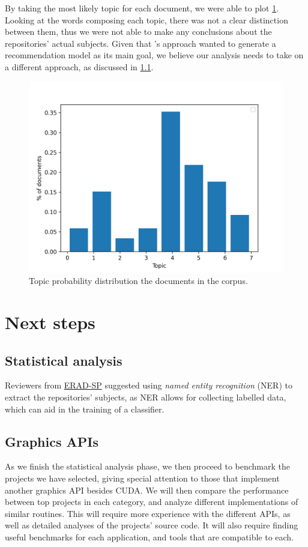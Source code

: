 \documentclass[conference, onecolumn]{IEEEtran}
\begin{document}
By taking the most likely topic for each document, we were able to plot
\cref{fig:topic-probabilities}.
Looking at the words composing each topic, there was not a clear distinction
between them, thus we were not able to make any conclusions about the
repositories' actual subjects.
Given that \cite{zheng2018measuring}'s approach wanted to generate a
recommendation model as its main goal, we believe our analysis needs to take on
a different approach, as discussed in \cref{sec:next-steps:statistics}.

\begin{figure}[H]
    \centering
    \includegraphics[width=0.7\linewidth]{topic-probabilities.png}
    \caption{Topic probability distribution the documents in the corpus.}
    \label{fig:topic-probabilities}
\end{figure}

\section{Next steps} \label{sec:next-steps}

\subsection{Statistical analysis} \label{sec:next-steps:statistics}

Reviewers from \href{https://jems.sbc.org.br/PaperShow.cgi?m=232692}{ERAD-SP}
suggested using \textit{named entity recognition} (NER) to extract the
repositories' subjects, as NER allows for collecting labelled data, which can
aid in the training of a classifier.

\subsection{Graphics APIs} \label{sec:next-steps-apis}

As we finish the statistical analysis phase, we then proceed to benchmark the
projects we have selected, giving special attention to those that implement
another graphics API besides CUDA.
We will then compare the performance between top projects in each category, and
analyze different implementations of similar routines.
This will require more experience with the different APIs, as well as
detailed analyses of the projects' source code.
It will also require finding useful benchmarks for each application, and tools
that are compatible to each.



\end{document}
